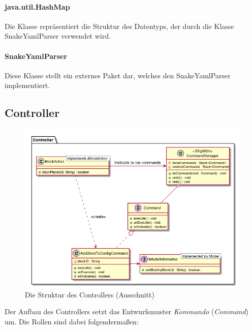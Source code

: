 \documentclass[parskip=full]{scrartcl}
\begin{document}
\paragraph{java.util.HashMap}
Die Klasse repräsentiert die Struktur des Datentyps, der durch die Klasse SnakeYamlParser verwendet wird.
\paragraph{SnakeYamlParser}
Diese Klasse stellt ein externes Paket dar, welches den SnakeYamlParser implementiert.

\clearpage
\subsection{Controller}

\begin{figure}[htbp]
	\begin{center}
		\includegraphics[width = 14cm]{Grafiken/Controller_Struktur.png}
		\caption{Die Struktur des Controllers (Ausschnitt)}
		\label{Controller_Struktur}
	\end{center}
\end{figure}

Der Aufbau des Controllers setzt das Entwurfsmuster \textit{Kommando} (\textit{Command}) um. Die Rollen sind dabei folgendermaßen:
\end{document}
